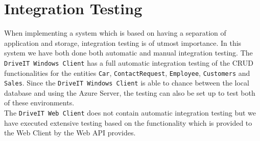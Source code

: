 \section{Integration Testing}
When implementing a system which is based on having a separation of application and storage, integration testing is of utmost importance. In this system we have both done both automatic and manual integration testing. The \texttt{DriveIT Windows Client} has a full automatic integration testing of the CRUD functionalities for the entities \texttt{Car}, \texttt{ContactRequest}, \texttt{Employee}, \texttt{Customers} and \texttt{Sales}. Since the \texttt{DriveIT Windows Client} is able to chance between the local database and using the Azure Server, the testing can also be set up to test both of these environments. \\
The \texttt{DriveIT Web Client} does not contain automatic integration testing but we have executed extensive testing based on the functionality which is provided to the Web Client by the Web API provides.